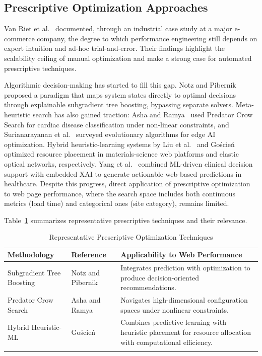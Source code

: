 \documentclass[sn-nature]{sn-jnl}
\begin{document}
\subsection{Prescriptive Optimization Approaches}

Van Riet et al.~\cite{vanriet2023} documented, through an industrial case study at a major e-commerce company, the degree to which performance engineering still depends on expert intuition and ad-hoc trial-and-error. Their findings highlight the scalability ceiling of manual optimization and make a strong case for automated prescriptive techniques.

Algorithmic decision-making has started to fill this gap. Notz and Pibernik~\cite{notz2024} proposed a paradigm that maps system states directly to optimal decisions through explainable subgradient tree boosting, bypassing separate solvers. Meta-heuristic search has also gained traction: Asha and Ramya~\cite{asha2025} used Predator Crow Search for cardiac disease classification under non-linear constraints, and Surianarayanan et al.~\cite{surianarayanan2023} surveyed evolutionary algorithms for edge AI optimization. Hybrid heuristic-learning systems by Liu et al.~\cite{liu2023} and Go\'{s}cie\'{n}~\cite{goscien2025} optimized resource placement in materials-science web platforms and elastic optical networks, respectively. Yang et al.~\cite{yang2025} combined ML-driven clinical decision support with embedded XAI to generate actionable web-based predictions in healthcare. Despite this progress, direct application of prescriptive optimization to web page performance, where the search space includes both continuous metrics (load time) and categorical ones (site category), remains limited.

Table~\ref{tab:prescriptive_methods} summarizes representative prescriptive techniques and their relevance.

\begin{table}[htbp]
\caption{Representative Prescriptive Optimization Techniques}\label{tab:prescriptive_methods}
\centering
\begin{tabular}{p{} p{} p{}}
\toprule
Methodology & Reference & Applicability to Web Performance \\
\midrule
Subgradient Tree Boosting &
Notz and Pibernik~\cite{notz2024} &
Integrates prediction with optimization to produce decision-oriented recommendations. \\

Predator Crow Search &
Asha and Ramya~\cite{asha2025} &
Navigates high-dimensional configuration spaces under nonlinear constraints. \\

Hybrid Heuristic-ML &
Go\'{s}cie\'{n}~\cite{goscien2025} &
Combines predictive learning with heuristic placement for resource allocation with computational efficiency. \\
\botrule
\end{tabular}
\end{table}
\end{document}
